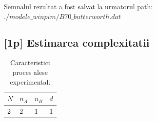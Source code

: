\documentclass[12pt,english]{article}
\begin{document}
Semnalul rezultat a fost salvat la urmatorul path: $./modele\_winpim/B70\_butterworth.dat$

\subsection {[1p] Estimarea complexitatii}

\begin{center}
\end{center}

\begin{center}
\end{center}

\begin{table}[H]
  \centering
  \begin{tabular}{|l|l|l|l|}
    \hline
    $N$ & $n_A$ & $n_B$ & $d$ \\
    \hline
    2 & 2 & 1 & 1 \\
    \hline
  \end{tabular}
  \caption{Caracteristici proces alese experimental.}
\end{table}
\end{document}
